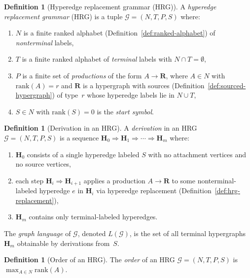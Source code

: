 \documentclass[11pt,a4paper]{article}
\theoremstyle{plain}
\theoremstyle{definition}
\newtheorem{definition}[theorem]{Definition}
\theoremstyle{remark}
\begin{document}
\begin{definition}[Hyperedge replacement grammar (HRG)]\label{def:hrg}
A \emph{hyperedge replacement grammar} (HRG) is a tuple $\mathcal{G} = (N, T, P, S)$ where:
\begin{enumerate}[nosep,label=(\roman*)]
  \item $N$ is a finite ranked alphabet (Definition~\ref{def:ranked-alphabet}) of \emph{nonterminal} labels,
  \item $T$ is a finite ranked alphabet of \emph{terminal} labels with $N \cap T = \emptyset$,
  \item $P$ is a finite set of \emph{productions} of the form $A \to \mathbf{R}$, where $A \in N$ with $\mathrm{rank}(A) = r$ and $\mathbf{R}$ is a hypergraph with sources (Definition~\ref{def:sourced-hypergraph}) of type~$r$ whose hyperedge labels lie in $N \cup T$,
  \item $S \in N$ with $\mathrm{rank}(S) = 0$ is the \emph{start symbol}.
\end{enumerate}
\end{definition}

\begin{definition}[Derivation in an HRG]\label{def:hrg-derivation}
A \emph{derivation} in an HRG $\mathcal{G} = (N,T,P,S)$ is a sequence $\mathbf{H}_0 \Rightarrow \mathbf{H}_1 \Rightarrow \cdots \Rightarrow \mathbf{H}_m$ where:
\begin{enumerate}[nosep,label=(\roman*)]
  \item $\mathbf{H}_0$ consists of a single hyperedge labeled $S$ with no attachment vertices and no source vertices,
  \item each step $\mathbf{H}_i \Rightarrow \mathbf{H}_{i+1}$ applies a production $A \to \mathbf{R}$ to some nonterminal-labeled hyperedge $e$ in $\mathbf{H}_i$ via hyperedge replacement (Definition~\ref{def:hrg-replacement}),
  \item $\mathbf{H}_m$ contains only terminal-labeled hyperedges.
\end{enumerate}
The \emph{graph language} of $\mathcal{G}$, denoted $L(\mathcal{G})$, is the set of all terminal hypergraphs $\mathbf{H}_m$ obtainable by derivations from~$S$.
\end{definition}

\begin{definition}[Order of an HRG]\label{def:hrg-order}
The \emph{order} of an HRG $\mathcal{G} = (N, T, P, S)$ is $\max_{A \in N} \mathrm{rank}(A)$.
\end{definition}
\end{document}
